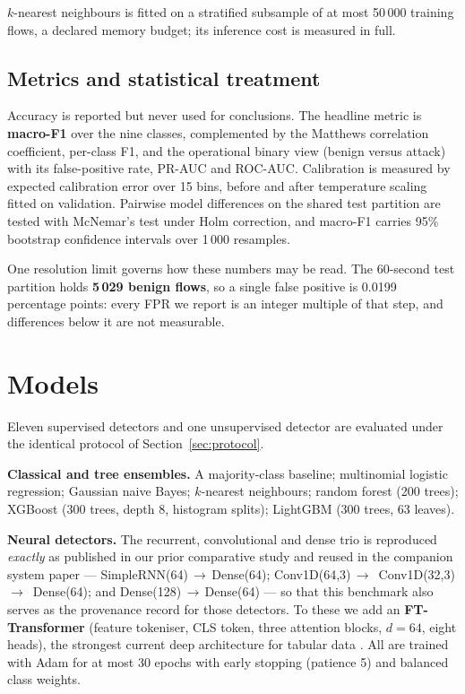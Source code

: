 \documentclass[review,12pt]{elsarticle}
\begin{document}
$k$-nearest neighbours is fitted on a stratified subsample of at most 50\,000 training
flows, a declared memory budget; its inference cost is measured in full.

\subsection{Metrics and statistical treatment}
Accuracy is reported but never used for conclusions. The headline metric is
\textbf{macro-F1} over the nine classes, complemented by the Matthews correlation
coefficient, per-class F1, and the operational binary view (benign versus attack) with
its false-positive rate, PR-AUC and ROC-AUC. Calibration is measured by expected
calibration error over 15 bins, before and after temperature scaling fitted on
validation. Pairwise model differences on the shared test partition are tested with
McNemar's test under Holm correction, and macro-F1 carries 95\% bootstrap confidence
intervals over 1\,000 resamples.

One resolution limit governs how these numbers may be read. The 60-second test partition
holds \textbf{5\,029 benign flows}, so a single false positive is 0.0199 percentage
points: every FPR we report is an integer multiple of that step, and differences below it
are not measurable.

\section{Models}
\label{sec:models}

Eleven supervised detectors and one unsupervised detector are evaluated under the
identical protocol of Section~\ref{sec:protocol}.

\textbf{Classical and tree ensembles.} A majority-class baseline; multinomial logistic
regression; Gaussian naive Bayes; $k$-nearest neighbours; random forest (200 trees);
XGBoost (300 trees, depth 8, histogram splits); LightGBM (300 trees, 63 leaves).

\textbf{Neural detectors.} The recurrent, convolutional and dense trio is reproduced
\emph{exactly} as published in our prior comparative study \cite{bahri2023comparative}
and reused in the companion system paper ---
SimpleRNN(64)\,$\to$\,Dense(64);\allowbreak{} Conv1D(64,3)\,$\to$\,\allowbreak{}
Conv1D(32,3)\,$\to$\,\allowbreak{} Dense(64);\allowbreak{} and
Dense(128)\,$\to$\,Dense(64) --- so that this benchmark also serves as
the provenance record for those detectors. To these we add an \textbf{FT-Transformer}
(feature tokeniser, CLS token, three attention blocks, $d=64$, eight heads), the strongest
current deep architecture for tabular data \cite{gorishniy2021ftt}. All are trained with
Adam for at most 30 epochs with early stopping (patience 5) and balanced class weights.
\end{document}
